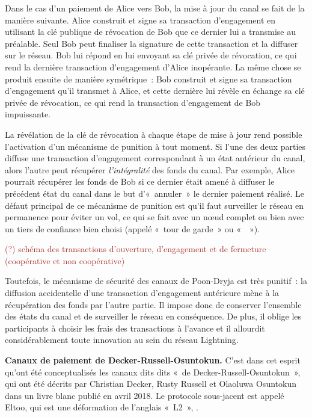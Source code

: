 Dans le cas d'un paiement de Alice vers Bob, la mise à jour du canal se fait de la manière suivante. Alice construit et signe sa transaction d'engagement en utilisant la clé publique de révocation de Bob que ce dernier lui a transmise au préalable. Seul Bob peut finaliser la signature de cette transaction et la diffuser sur le réseau. Bob lui répond en lui envoyant sa clé privée de révocation, ce qui rend la dernière transaction d'engagement d'Alice inopérante. La même chose se produit ensuite de manière symétrique~: Bob construit et signe sa transaction d'engagement qu'il transmet à Alice, et cette dernière lui révèle en échange sa clé privée de révocation, ce qui rend la transaction d'engagement de Bob impuissante.

La révélation de la clé de révocation à chaque étape de mise à jour rend possible l'activation d'un mécanisme de punition à tout moment. Si l'une des deux parties diffuse une transaction d'engagement correspondant à un état antérieur du canal, alors l'autre peut récupérer \emph{l'intégralité} des fonds du canal. Par exemple, Alice pourrait récupérer les fonds de Bob si ce dernier était amené à diffuser le précédent état du canal dans le but d'«~annuler~» le dernier paiement réalisé. Le défaut principal de ce mécanisme de punition est qu'il faut surveiller le réseau en permanence pour éviter un vol, ce qui se fait avec un nœud complet ou bien avec un tiers de confiance bien choisi (appelé «~tour de garde~» ou «~~»).

\textcolor{brown}{(?) schéma des transactions d'ouverture, d'engagement et de fermeture (coopérative et non coopérative)}

Toutefois, le mécanisme de sécurité des canaux de Poon-Dryja est très punitif~: la diffusion accidentelle d'une transaction d'engagement antérieure mène à la récupération des fonds par l'autre partie. Il impose donc de conserver l'ensemble des états du canal et de surveiller le réseau en conséquence. De plus, il oblige les participants à choisir les frais des transactions à l'avance et il allourdit considérablement toute innovation au sein du réseau Lightning.


\textbf{Canaux de paiement de Decker-Russell-Osuntokun.} C'est dans cet esprit qu'ont été conceptualisés les canaux dits dits «~de Decker-Russell-Osuntokun~», qui ont été décrits par Christian Decker, Rusty Russell et Olaoluwa Osuntokun dans un livre blanc publié en avril 2018. Le protocole sous-jacent est appelé Eltoo, qui est une déformation de l'anglais «~L2~», .

